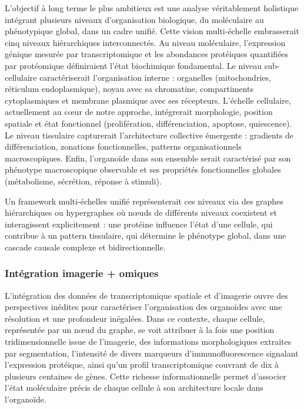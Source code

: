 L'objectif à long terme le plus ambitieux est une analyse véritablement holistique intégrant plusieurs niveaux d'organisation biologique, du moléculaire au phénotypique global, dans un cadre unifié. Cette vision multi-échelle embrasserait cinq niveaux hiérarchiques interconnectés. Au niveau moléculaire, l'expression génique mesurée par transcriptomique et les abondances protéiques quantifiées par protéomique définiraient l'état biochimique fondamental. Le niveau sub-cellulaire caractériserait l'organisation interne : organelles (mitochondries, réticulum endoplasmique), noyau avec sa chromatine, compartiments cytoplasmiques et membrane plasmique avec ses récepteurs. L'échelle cellulaire, actuellement au cœur de notre approche, intégrerait morphologie, position spatiale et état fonctionnel (prolifération, différenciation, apoptose, quiescence). Le niveau tissulaire capturerait l'architecture collective émergente : gradients de différenciation, zonations fonctionnelles, patterns organisationnels macroscopiques. Enfin, l'organoïde dans son ensemble serait caractérisé par son phénotype macroscopique observable et ses propriétés fonctionnelles globales (métabolisme, sécrétion, réponse à stimuli).

Un framework multi-échelles unifié représenterait ces niveaux via des graphes hiérarchiques ou hypergraphes où nœuds de différents niveaux coexistent et interagissent explicitement : une protéine influence l'état d'une cellule, qui contribue à un pattern tissulaire, qui détermine le phénotype global, dans une cascade causale complexe et bidirectionnelle.

\subsubsection{Intégration imagerie + omiques}

L’intégration des données de transcriptomique spatiale et d’imagerie ouvre des perspectives inédites pour caractériser l’organisation des organoïdes avec une résolution et une profondeur inégalées. Dans ce contexte, chaque cellule, représentée par un nœud du graphe, se voit attribuer à la fois une position tridimensionnelle issue de l’imagerie, des informations morphologiques extraites par segmentation, l’intensité de divers marqueurs d’immunofluorescence signalant l’expression protéique, ainsi qu’un profil transcriptomique couvrant de dix à plusieurs centaines de gènes. Cette richesse informationnelle permet d’associer l’état moléculaire précis de chaque cellule à son architecture locale dans l’organoïde.

